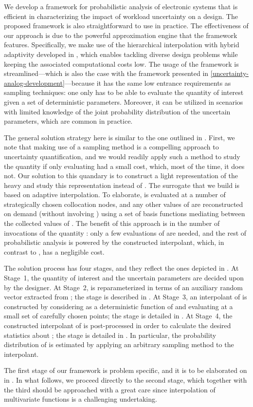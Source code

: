We develop a framework for probabilistic analysis of electronic systems that is
efficient in characterizing the impact of workload uncertainty on a design. The
proposed framework is also straightforward to use in practice. The effectiveness
of our approach is due to the powerful approximation engine that the framework
features. Specifically, we make use of the hierarchical interpolation with
hybrid adaptivity developed in \cite{klimke2006, ma2009, jakeman2012}, which
enables tackling diverse design problems while keeping the associated
computational costs low. The usage of the framework is streamlined---which is
also the case with the framework presented in
\cref{uncertainty-analog-development}---because it has the same low entrance
requirements as sampling techniques: one only has to be able to evaluate the
quantity of interest given a set of deterministic parameters. Moreover, it can
be utilized in scenarios with limited knowledge of the joint probability
distribution of the uncertain parameters, which are common in practice.

The general solution strategy here is similar to the one outlined in
. First, we note that making use of a sampling method is a
compelling approach to uncertainty quantification, and we would readily apply
such a method to study the quantity \g if only evaluating \g had a small cost,
which, most of the time, it does not. Our solution to this quandary is to
construct a light representation of the heavy \g and study this representation
instead of \g. The surrogate that we build is based on adaptive interpolation.
To elaborate, \g is evaluated at a number of strategically chosen collocation
nodes, and any other values of \g are reconstructed on demand (without involving
\g) using a set of basis functions mediating between the collected values of \g.
The benefit of this approach is in the number of invocations of the quantity \g:
only a few evaluations of \g are needed, and the rest of probabilistic analysis
is powered by the constructed interpolant, which, in contrast to \g, has a
negligible cost.

The solution process has four stages, and they reflect the ones depicted in
. At Stage~1, the quantity of interest \g and the uncertain
parameters \vu are decided upon by the designer. At Stage~2, \g is
reparameterized in terms of an auxiliary random vector \vz extracted from \vu;
the stage is described in . At Stage~3, an
interpolant of \g is constructed by considering \g as a deterministic function
of \vz and evaluating \g at a small set of carefully chosen points; the stage is
detailed in . At Stage~4, the constructed interpolant
of \g is post-processed in order to calculate the desired statistics about \g;
the stage is detailed in . In particular, the probability
distribution of \g is estimated by applying an arbitrary sampling method to the
interpolant.

The first stage of our framework is problem specific, and it is to be elaborated
on in . In what follows, we proceed directly to the
second stage, which together with the third should be approached with a great
care since interpolation of multivariate functions is a challenging undertaking.
